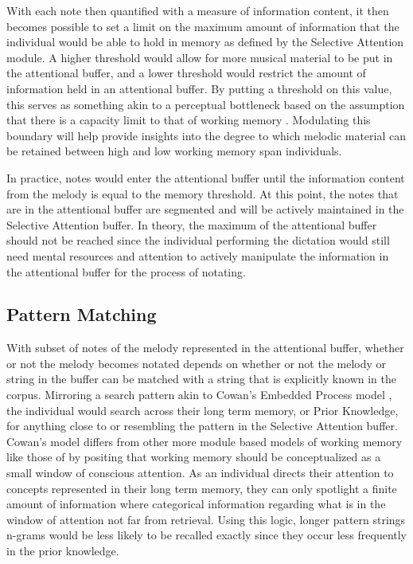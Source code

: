 \documentclass[]{book}
\begin{document}
With each note then quantified with a measure of information content, it then becomes possible to set a limit on the maximum amount of information that the individual would be able to hold in memory as defined by the Selective Attention module.
A higher threshold would allow for more musical material to be put in the attentional buffer, and a lower threshold would restrict the amount of information held in an attentional buffer.
By putting a threshold on this value, this serves as something akin to a perceptual bottleneck based on the assumption that there is a capacity limit to that of working memory \citep{cowanEvolvingConceptionsMemory1988, cowanMagicalMysteryFour2010}.
Modulating this boundary will help provide insights into the degree to which melodic material can be retained between high and low working memory span individuals.

In practice, notes would enter the attentional buffer until the information content from the melody is equal to the memory threshold.
At this point, the notes that are in the attentional buffer are segmented and will be actively maintained in the Selective Attention buffer.
In theory, the maximum of the attentional buffer should not be reached since the individual performing the dictation would still need mental resources and attention to actively manipulate the information in the attentional buffer for the process of notating.

\hypertarget{pattern-matching}{%
\subsection{Pattern Matching}\label{pattern-matching}}

With subset of notes of the melody represented in the attentional buffer, whether or not the melody becomes notated depends on whether or not the melody or string in the buffer can be matched with a string that is explicitly known in the corpus.
Mirroring a search pattern akin to Cowan's Embedded Process model \citep{cowanEvolvingConceptionsMemory1988, cowanMagicalMysteryFour2010}, the individual would search across their long term memory, or Prior Knowledge, for anything close to or resembling the pattern in the Selective Attention buffer.
Cowan's model differs from other more module based models of working memory like those of \citet{baddeleyWorkingMemory1974} by positing that working memory should be conceptualized as a small window of conscious attention.
As an individual directs their attention to concepts represented in their long term memory, they can only spotlight a finite amount of information where categorical information regarding what is in the window of attention not far from retrieval.
Using this logic, longer pattern strings n-grams would be less likely to be recalled exactly since they occur less frequently in the prior knowledge.
\end{document}

